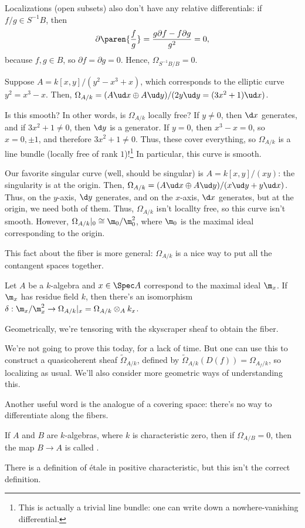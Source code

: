 Localizations (open subsets) also don't have any relative differentials: if \(f/g\in S^{-1}B\), then
\[\partial\paren{\frac fg} = \frac{g\partial f - f\partial g}{g^2} = 0,\]
because \(f,g\in B\), so \(\partial f = \partial g = 0\). Hence, \(\Omega_{S^{-1}B/B} = 0\).
\begin{exm}
Suppose \(A = k[x,y]/(y^2 - x^3 + x)\), which corresponds to the elliptic curve \(y^2 = x^3 - x\). Then,
\(\Omega_{A/k} = (A\ud x\oplus A\ud y) / (2y\ud y = (3x^2+1)\ud x)\).

Is this smooth? In other words, is \(\Omega_{A/k}\) locally free? If \(y\ne 0\), then \(\d x\) generates, and if
\(3x^2 + 1\ne 0\), then \(\d y\) is a generator. If \(y = 0\), then \(x^3 - x = 0\), so \(x = 0,\pm 1\), and
therefore \(3x^2+1\ne 0\). Thus, these cover everything, so \(\Omega_{A/k}\) is a line bundle (locally free of rank
\(1\))!\footnote{This is actually a trivial line bundle: one can write down a nowhere-vanishing differential.} In
particular, this curve is smooth.
\end{exm}
\begin{exm}
Our favorite singular curve (well, should be singular) is \(A = k[x,y]/(xy)\): the singularity is at the origin.
Then, \(\Omega_{A/k} = (A\ud x\oplus A\ud y)/(x\ud y + y\ud x)\). Thus, on the \(y\)-axis, \(\d y\) generates, and
on the \(x\)-axis, \(\d x\) generates, but at the origin, we need both of them. Thus, \(\Omega_{A/k}\) isn't
locallty free, so this curve isn't smooth. However, \(\Omega_{A/k}|_0\cong\m_0/\m_0^2\), where \(\m_0\) is the
maximal ideal corresponding to the origin.
\end{exm}
This fact about the fiber is more general: \(\Omega_{A/k}\) is a nice way to put all the contangent spaces
together.
\begin{prop}
Let \(A\) be a \(k\)-algebra and \(x\in\Spec A\) correspond to the maximal ideal \(\m_x\). If \(\m_x\) has residue
field \(k\), then there's an isomorphism \(\delta:\m_x/\m_x^2\to\Omega_{A/k}|_x = \Omega_{A/k}\otimes_A k_x\).
\end{prop}
Geometrically, we're tensoring with the skyscraper sheaf to obtain the fiber.

We're not going to prove this today, for a lack of time. But one can use this to construct a quasicoherent sheaf
\(\widetilde\Omega_{A/k}\), defined by \(\widetilde\Omega_{A/k}(D(f)) = \Omega_{A_f/k}\), so localizing as usual.
We'll also consider more geometric ways of understanding this.

Another useful word is the analogue of a covering space: there's no way to differentiate along the fibers.
\begin{defn}
If \(A\) and \(B\) are \(k\)-algebras, where \(k\) is characteristic zero, then if \(\Omega_{A/B} = 0\), then the
map \(B\to A\) is called .
\end{defn}
There is a definition of étale in positive characteristic, but this isn't the correct definition.
